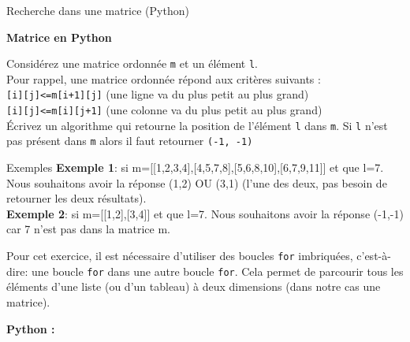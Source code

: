 \begin{Exercice}[20 minutes] Recherche dans une matrice (Python) %
    
    \textbf{Matrice en Python}

    Considérez une matrice ordonnée \lstinline{m} et un élément \lstinline{l}.\\
    
    Pour rappel, une matrice ordonnée répond aux critères suivants :\\
     \lstinline{[i][j]<=m[i+1][j]} (une ligne va du plus petit au plus grand)\\
     \lstinline{[i][j]<=m[i][j+1]} (une colonne va du plus petit au plus grand)\\
 
    
    Écrivez un algorithme qui retourne la position de l’élément \lstinline{l} dans \lstinline{m}. Si \lstinline{l} n’est pas présent dans \lstinline{m} alors il faut retourner \lstinline{(-1, -1)}\\
    
    \begin{Example}{\faTerminal \quad Exemples}
        \textbf{Exemple 1}: si m=[[1,2,3,4],[4,5,7,8],[5,6,8,10],[6,7,9,11]] et que l=7. Nous souhaitons avoir la réponse (1,2) OU (3,1) (l’une des deux, pas besoin de retourner les deux résultats).\\

        \textbf{Exemple 2}: si m=[[1,2],[3,4]] et que l=7. Nous souhaitons avoir la réponse (-1,-1) car 7 n’est pas dans la matrice m.
    \end{Example}

    

    \begin{conseil}
    Pour cet exercice, il est nécessaire d'utiliser des boucles \lstinline{for} imbriquées, c'est-à-dire: une boucle \lstinline{for} dans une autre boucle \lstinline{for}. Cela permet de parcourir tous les éléments d'une liste (ou d'un tableau) à deux dimensions (dans notre cas une matrice). 
    \end{conseil}

    \begin{solution}
        \textbf{Python :}
        
    \end{solution}

\end{Exercice}


